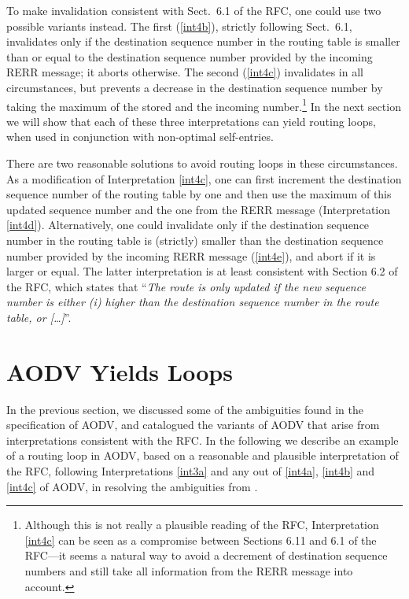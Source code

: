 \documentclass[letterpaper]{sig-alternate-pages}
\begin{document}
To make 
invalidation consistent with Sect.~6.1 of the RFC, one could
use two possible variants instead. The first (\ref{int4b}), strictly following Sect.~6.1, 
invalidates only if the destination sequence number in the routing table is smaller than or equal to 
 the destination sequence number provided by the incoming RERR message; it aborts otherwise.
The second (\ref{int4c})
invalidates in all circumstances, but prevents a decrease in the destination
sequence number by taking the maximum of the stored and the incoming number.\footnote{Although this is not really a plausible reading of the RFC, Interpretation  \ref{int4c} can be seen as a compromise between Sections 6.11 and 6.1 of the RFC---it seems a natural way to avoid a decrement of destination sequence numbers and still 
take all information from the RERR message into account.}
In the next section we will show that each of these three interpretations can yield 
routing loops, when used in conjunction with non-optimal self-entries.

There are two reasonable solutions to avoid routing loops in these circumstances. 
As a modification of Interpretation \ref{int4c},
one can first increment the destination sequence number of the routing
table by one and then use the maximum of this updated sequence number
and the one from the RERR message (Interpretation \ref{int4d}).
Alternatively, one could 
invalidate only if the destination sequence number in the routing table is (strictly) smaller than the destination sequence number provided by the incoming RERR 
message (\ref{int4e}),
and abort if it is larger or equal.
The latter interpretation is at least consistent with Section 6.2 of the RFC, which states that
``{\em The route is only updated if  the new sequence number is either (i)
   higher than the destination sequence number in the route table, or {[\dots]\/}}''.

\section{AODV Yields Loops}\label{sec:loops}
In the previous section, we discussed some of the ambiguities found in the specification of AODV, and catalogued the variants of AODV that arise from interpretations consistent with the RFC.
In the following we describe an example of a routing loop in AODV, based on a reasonable and
plausible interpretation of the RFC, following Interpretations \ref{int3a} and any out of \ref{int4a}, \ref{int4b} and \ref{int4c}
  of AODV, in resolving the ambiguities from .
\end{document}

